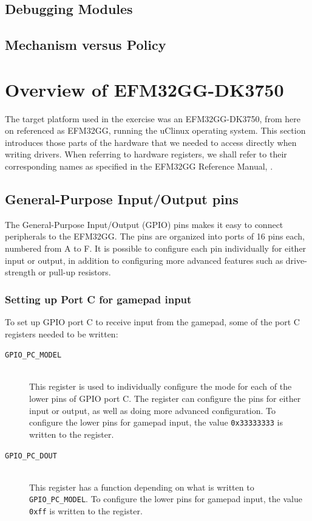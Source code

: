 \subsection{Debugging Modules}


\subsection{Mechanism versus Policy}



\section{Overview of EFM32GG-DK3750}
The target platform used in the exercise was an EFM32GG-DK3750, from here on referenced as EFM32GG, running the uClinux operating system. This section introduces those parts of the hardware that we needed to access directly when writing drivers. When referring to hardware registers, we shall refer to their corresponding names as specified in the EFM32GG Reference Manual, \cite{efm32gg-rm}.


\subsection{General-Purpose Input/Output pins}\label{sec:gpio}
The General-Purpose Input/Output (GPIO) pins makes it easy to connect peripherals to the EFM32GG. The pins are organized into ports of 16 pins each, numbered from A to F. It is possible to configure each pin individually for either input or output, in addition to configuring more advanced features such as drive-strength or pull-up resistors.

\subsubsection{Setting up Port C for gamepad input}\label{sec:gpio-access}
To set up GPIO port C to receive input from the gamepad, some of the port C registers needed to be written:
\begin{description}
  \item[\texttt{GPIO\_PC\_MODEL}] \hfill \\
    This register is used to individually configure the mode for each of the lower pins of GPIO port C. The register can configure the pins for either input or output, as well as doing more advanced configuration. To configure the lower pins for gamepad input, the value \texttt{0x33333333} is written to the register.
  \item[\texttt{GPIO\_PC\_DOUT}] \hfill \\ 
    This register has a function depending on what is written to \texttt{GPIO\_PC\_MODEL}. To configure the lower pins for gamepad input, the value \texttt{0xff} is written to the register.
\end{description}

